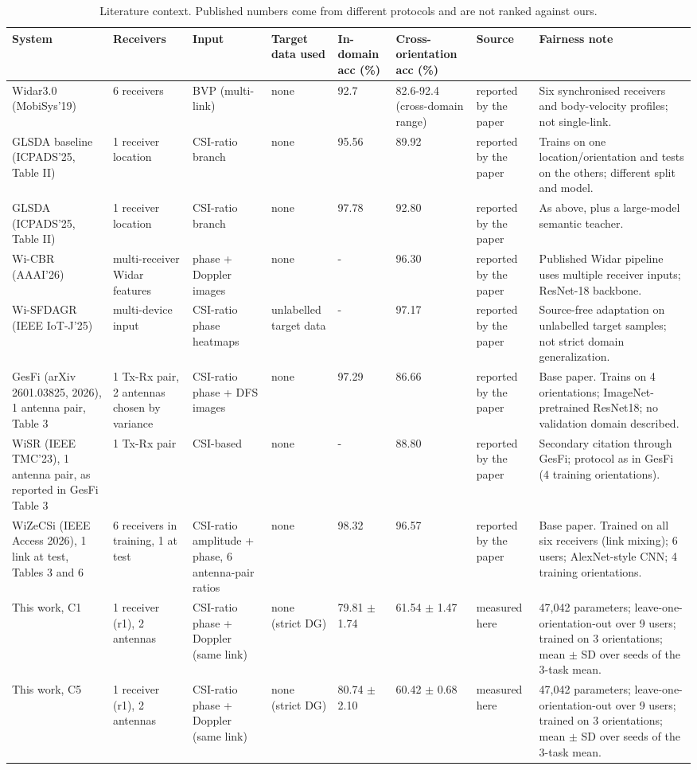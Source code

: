 \begin{table}[t]
\centering
\small
\caption{Literature context. Published numbers come from different protocols and are not ranked against ours.}
\label{tab:T6_literature_context}
\begin{tabular}{llllllll}
\hline
System & Receivers & Input & Target data used & In-domain acc (\%) & Cross-orientation acc (\%) & Source & Fairness note \\
\hline
Widar3.0 (MobiSys'19) & 6 receivers & BVP (multi-link) & none & 92.7 & 82.6-92.4 (cross-domain range) & reported by the paper & Six synchronised receivers and body-velocity profiles; not single-link. \\
GLSDA baseline (ICPADS'25, Table II) & 1 receiver location & CSI-ratio branch & none & 95.56 & 89.92 & reported by the paper & Trains on one location/orientation and tests on the others; different split and model. \\
GLSDA (ICPADS'25, Table II) & 1 receiver location & CSI-ratio branch & none & 97.78 & 92.80 & reported by the paper & As above, plus a large-model semantic teacher. \\
Wi-CBR (AAAI'26) & multi-receiver Widar features & phase + Doppler images & none & - & 96.30 & reported by the paper & Published Widar pipeline uses multiple receiver inputs; ResNet-18 backbone. \\
Wi-SFDAGR (IEEE IoT-J'25) & multi-device input & CSI-ratio phase heatmaps & unlabelled target data & - & 97.17 & reported by the paper & Source-free adaptation on unlabelled target samples; not strict domain generalization. \\
GesFi (arXiv 2601.03825, 2026), 1 antenna pair, Table 3 & 1 Tx-Rx pair, 2 antennas chosen by variance & CSI-ratio phase + DFS images & none & 97.29 & 86.66 & reported by the paper & Base paper. Trains on 4 orientations; ImageNet-pretrained ResNet18; no validation domain described. \\
WiSR (IEEE TMC'23), 1 antenna pair, as reported in GesFi Table 3 & 1 Tx-Rx pair & CSI-based & none & - & 88.80 & reported by the paper & Secondary citation through GesFi; protocol as in GesFi (4 training orientations). \\
WiZeCSi (IEEE Access 2026), 1 link at test, Tables 3 and 6 & 6 receivers in training, 1 at test & CSI-ratio amplitude + phase, 6 antenna-pair ratios & none & 98.32 & 96.57 & reported by the paper & Base paper. Trained on all six receivers (link mixing); 6 users; AlexNet-style CNN; 4 training orientations. \\
This work, C1 & 1 receiver (r1), 2 antennas & CSI-ratio phase + Doppler (same link) & none (strict DG) & 79.81 $\pm$ 1.74 & 61.54 $\pm$ 1.47 & measured here & 47,042 parameters; leave-one-orientation-out over 9 users; trained on 3 orientations; mean $\pm$ SD over seeds of the 3-task mean. \\
This work, C5 & 1 receiver (r1), 2 antennas & CSI-ratio phase + Doppler (same link) & none (strict DG) & 80.74 $\pm$ 2.10 & 60.42 $\pm$ 0.68 & measured here & 47,042 parameters; leave-one-orientation-out over 9 users; trained on 3 orientations; mean $\pm$ SD over seeds of the 3-task mean. \\
\hline
\end{tabular}
\end{table}
